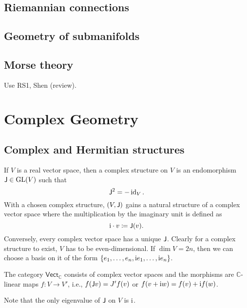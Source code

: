 \section{Riemannian connections}



\section{Geometry of submanifolds}



\section{Morse theory}

Use RS1, Shen (review). 







\clearpage
\chapter{Complex Geometry \texorpdfstring{\ucmark}{}}


\section{Complex and Hermitian structures}

\begin{defn}
    If $V$ is a real vector space, then a complex structure on $V$ is an endomorphism $\mathsf{J}\in \operatorname{GL}(V)$ such that 
    \[\mathsf{J}^2=-\operatorname{id}_V.\]
    With a chosen complex structure, $(V,\mathsf{J})$ gains a natural structure of a complex vector space where the multiplication by the imaginary unit is defined as
    \[\mathrm{i}\cdot v\coloneqq \mathsf{J}(v).\]
    Conversely, every complex vector space has a unique $\mathsf{J}$. Clearly for a complex structure to exist, $V$ has to be even-dimensional. If $\dim V=2n$, then we can choose a basis on it of the form $\{e_1,\ldots,e_n,\mathrm{i} e_1,\ldots,\mathrm{i} e_n\}$.
    
    The category $\mathsf{Vect}_{\mathbb{C}}$ consists of complex vector spaces and the morphisms are $\mathbb{C}$-linear maps $f:V\to V'$, i.e., $f(\mathsf{J} v)=J' f(v)$ or $f(v+\mathrm{i} w)=f(v)+\mathrm{i} f(w)$.
\end{defn}

Note that the only eigenvalue of $\mathsf{J}$ on $V$ is $\mathrm{i}$.

